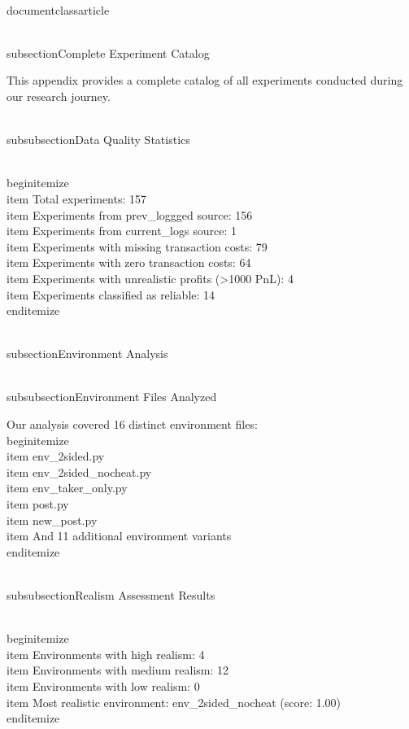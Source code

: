 \\documentclass{article}
\begin{document}
\\subsection{Complete Experiment Catalog}

This appendix provides a complete catalog of all experiments conducted during our research journey.

\\subsubsection{Data Quality Statistics}

\\begin{itemize}
\\item Total experiments: 157
\\item Experiments from prev\_loggged source: 156
\\item Experiments from current\_logs source: 1
\\item Experiments with missing transaction costs: 79
\\item Experiments with zero transaction costs: 64
\\item Experiments with unrealistic profits (>1000 PnL): 4
\\item Experiments classified as reliable: 14
\\end{itemize}

\\subsection{Environment Analysis}

\\subsubsection{Environment Files Analyzed}

Our analysis covered 16 distinct environment files:
\\begin{itemize}
\\item env\_2sided.py
\\item env\_2sided\_nocheat.py
\\item env\_taker\_only.py
\\item post.py
\\item new\_post.py
\\item And 11 additional environment variants
\\end{itemize}

\\subsubsection{Realism Assessment Results}

\\begin{itemize}
\\item Environments with high realism: 4
\\item Environments with medium realism: 12
\\item Environments with low realism: 0
\\item Most realistic environment: env\_2sided\_nocheat (score: 1.00)
\\end{itemize}
\end{document}
